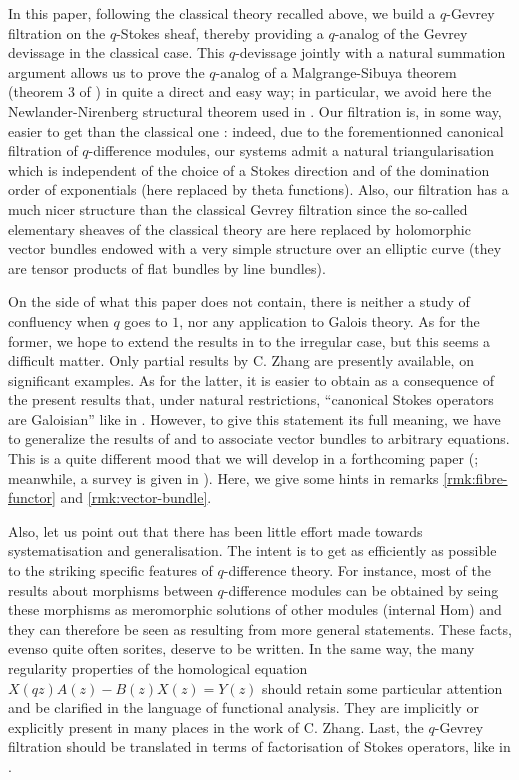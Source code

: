\documentclass[english]{smfart}
\numberwithin{equation}{thm}
\begin{document}
In this paper, following the classical theory recalled above, 
we build a $q$-Gevrey filtration on the
$q$-Stokes sheaf, thereby providing a $q$-analog of the Gevrey
devissage in the classical case. This $q$-devissage jointly with
a natural summation argument allows us  to prove  the $q$-analog
of a Malgrange-Sibuya theorem (theorem 3 of \cite{Varadarajan})
in  quite a direct and easy way; in particular, we avoid here
the Newlander-Nirenberg structural theorem used in \cite{RSZ}.
Our filtration is, in some way, easier to get than the classical
one : indeed, due to the forementionned canonical filtration of
$q$-difference  modules, our systems admit a natural
triangularisation which is independent of the choice of a Stokes
direction  and of the domination order of exponentials
(here replaced by theta functions). Also, our
filtration has a much nicer structure than the classical Gevrey
filtration since the so-called elementary sheaves of the
classical theory are here replaced by holomorphic vector bundles
endowed with a very simple structure over an elliptic curve
(they are tensor products of flat bundles by line bundles).

\bigskip

On the side of what this paper does not contain, there
is neither a study of confluency when $q$ goes to $1$,
nor any application to Galois theory. As for the former,
we hope to extend the results in \cite{JSAIF} to the
irregular case, but this seems a difficult matter. Only partial
results by C. Zhang are presently available, on significant
examples. As for the latter, it is easier to obtain as a
consequence of the present results that, under natural
restrictions, ``canonical Stokes operators are Galoisian'' like in
\cite{MLR}. However, to give this statement its full meaning, 
we have to generalize the results of \cite{JSGAL} and to associate 
vector bundles to arbitrary equations. This is a quite different mood 
that we will develop in a forthcoming paper (\cite{JSIRR}; meanwhile,
a survey is given in \cite{JSISOMONO}). Here, we give some hints
in remarks \ref{rmk:fibre-functor} and \ref{rmk:vector-bundle}.


Also, let us point out that there has been little effort made
towards systematisation and generalisation. The intent is to
get as efficiently as possible to the striking specific
features of $q$-difference theory. For instance, most of
the results about morphisms between $q$-difference modules
can be obtained by seing these morphisms as meromorphic solutions
of other modules (internal Hom) and  they can therefore be seen
as resulting from more general statements. These facts, evenso
quite often sorites,  deserve to be written. In the
same way, the many regularity properties of the homological
equation $X(qz)A(z)-B(z)X(z)=Y(z)$ should retain some particular
attention and  be clarified in the language of functional
analysis. They are implicitly or explicitly present in many
places in the work of C. Zhang. Last, the $q$-Gevrey filtration
should be translated in terms of factorisation of Stokes
operators, like in \cite{MLR}. \\
\bigskip
\end{document}
